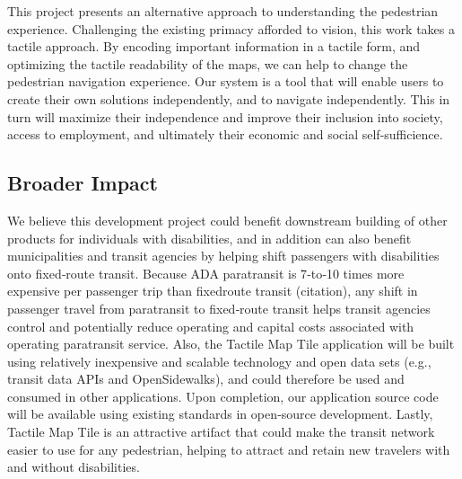 


This project presents an alternative approach to understanding the pedestrian experience. Challenging the existing primacy afforded to vision, this work takes a tactile approach. 
By encoding important information in a tactile form, and optimizing the tactile readability of the maps, we can help to change the pedestrian navigation experience. Our system is a tool that will enable users to create their own solutions independently, and to navigate independently. This in turn will maximize their independence and improve their inclusion into society, access to employment, and ultimately their economic and social self-sufficience. 

\subsection{Broader Impact}
We believe this development project could benefit downstream building of other products for individuals with disabilities, and in addition can also benefit municipalities and transit agencies by helping shift passengers with disabilities onto fixed‐route transit. 
Because ADA paratransit is 7‐to‐10 times more expensive per passenger trip than fixedroute transit \ac{(citation)}, any shift in passenger travel from paratransit to fixed‐route transit helps transit agencies control and potentially reduce operating and capital costs associated with
operating paratransit service. Also, the Tactile Map Tile application will be built using relatively inexpensive and scalable technology and open data sets (e.g., transit data APIs and OpenSidewalks), and could therefore be used and consumed in other applications. Upon completion, our application source code will be available using existing standards in open‐source development.
Lastly, Tactile Map Tile is an attractive artifact that could make the transit network easier to use for any pedestrian, helping to attract and retain new travelers with and without disabilities.

